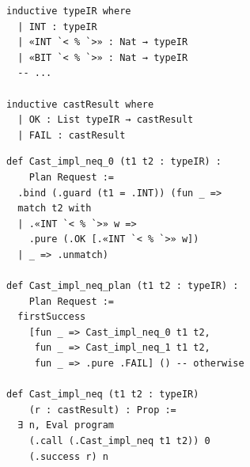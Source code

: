 \begin{examplerow}
\begin{minipage}[t]{0.5\linewidth}
\vspace{0pt}
\begin{lstlisting}[style=leanexample,style=examplecolumn]
inductive typeIR where
  | INT : typeIR
  | «INT `< % `>» : Nat → typeIR
  | «BIT `< % `>» : Nat → typeIR
  -- ...

inductive castResult where
  | OK : List typeIR → castResult
  | FAIL : castResult
\end{lstlisting}
\end{minipage}%
\begin{minipage}[t]{0.5\linewidth}
\vspace{0pt}
\begin{lstlisting}[style=leanexample,style=examplecolumn]
def Cast_impl_neq_0 (t1 t2 : typeIR) :
    Plan Request :=
  .bind (.guard (t1 = .INT)) (fun _ =>
  match t2 with
  | .«INT `< % `>» w =>
    .pure (.OK [.«INT `< % `>» w])
  | _ => .unmatch)

def Cast_impl_neq_plan (t1 t2 : typeIR) :
    Plan Request :=
  firstSuccess
    [fun _ => Cast_impl_neq_0 t1 t2,
     fun _ => Cast_impl_neq_1 t1 t2,
     fun _ => .pure .FAIL] () -- otherwise

def Cast_impl_neq (t1 t2 : typeIR)
    (r : castResult) : Prop :=
  ∃ n, Eval program
    (.call (.Cast_impl_neq t1 t2)) 0
    (.success r) n
\end{lstlisting}
\end{minipage}
\end{examplerow}
